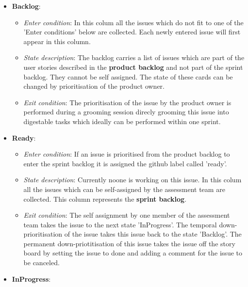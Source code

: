 \documentclass[openetcs]{template/openetcs_article}
\begin{document}
\begin{itemize}

\item \textbf{Backlog}:

\begin{itemize}
\item \textit{Enter condition}: In this colum all the issues which do not fit to one of the 'Enter conditions' below are collected. Each newly entered issue will first appear in this column.
\item \textit{State description}: The backlog carries a list of issues which are part of the user stories described in the \textbf{product backlog} and not part of the sprint backlog. They cannot be self assigned. The state of these cards can be changed by prioritisation of the product owner.
\item \textit{Exit condition}: The prioritisation of the issue by the product owner  is performed during a grooming session direcly grooming this issue into digestable tasks which ideally can be performed within one sprint.
\end{itemize}

\item \textbf{Ready}: 

\begin{itemize}
\item \textit{Enter condition}: If an issue is prioritised from the product backlog to enter the sprint backlog it is assigned the github label called 'ready'.
\item \textit{State description}: Currently noone is working on this issue. In this colum all the issues which can be self-assigned by the assessment team are collected. This column represents the \textbf{sprint backlog}.
\item \textit{Exit condition}: The self assignment by one member of the assessment team takes the issue to the next state 'InProgress'. The temporal down-prioritisation of the issue takes this issue back to the state 'Backlog'. The permanent down-priotitisation of this issue takes the issue off the story board by setting the issue to done and adding a comment for the issue to be canceled.
\end{itemize}



\item \textbf{InProgress}:


\end{itemize}
\end{document}
